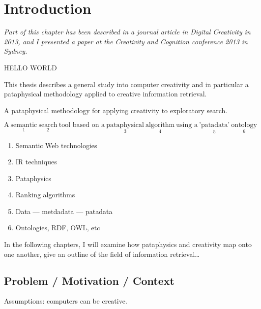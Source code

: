 
\chapter{Introduction}
\label{ch:intro}

\vspace{1cm}
\startcontents[chapters]
\minicontents
\vspace{1cm}

\emph{Part of this chapter has been described in a journal article in Digital Creativity in 2013, and I presented a paper at the Creativity and Cognition conference 2013 in Sydney.} 

\grule %

{\color{red} HELLO WORLD}%

This thesis describes a general study into computer creativity and in particular a pataphysical methodology applied to creative information retrieval.

A pataphysical methodology for applying creativity to exploratory search.

{\small $\text{A} \ \underset{1}{\text{semantic}} \ \underset{2}{\text{search}} \ \text{tool based on a} \ \underset{3}{\text{pataphysical}} \ \underset{4}{\text{algorithm}} \ \text{using a} \ \underset{5}{\text{'patadata'}} \ \underset{6}{\text{ontology}}$
}

\begin{enumerate}
  \item Semantic Web technologies
  \item IR techniques
  \item Pataphysics
  \item Ranking algorithms
  \item Data --- metdadata --- patadata
  \item Ontologies, RDF, OWL, etc
\end{enumerate}


In the following chapters, I will examine how pataphysics and creativity map onto one another, give an outline of the field of information retrieval\ldots

\section{Problem / Motivation / Context}

Assumptions: computers can be creative.

